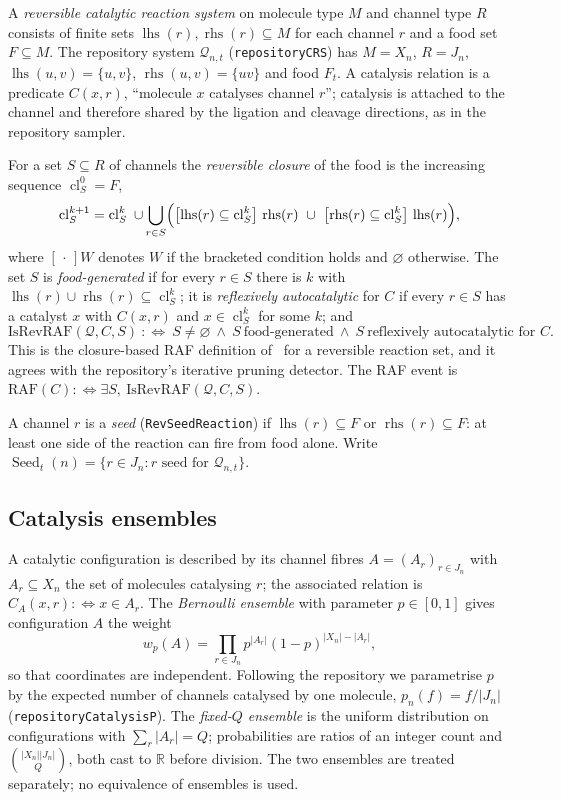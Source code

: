 \documentclass[11pt,a4paper]{article}
\theoremstyle{plain}
\theoremstyle{definition}
\theoremstyle{remark}
\newcommand{\lean}[1]{\begingroup\def\_{\char`\_\allowbreak}\texttt{#1}\endgroup}
\newcommand{\RAF}{\mathrm{RAF}}
\newcommand{\cQ}{\mathcal{Q}}
\newcommand{\lhs}{\operatorname{lhs}}
\newcommand{\rhs}{\operatorname{rhs}}
\newcommand{\cl}{\operatorname{cl}}
\newcommand{\seed}{\operatorname{Seed}}
\newcommand{\Real}{\mathbb{R}}
\begin{document}
A \emph{reversible catalytic reaction system} on molecule type $M$ and channel type $R$ consists of finite sets $\lhs(r),\rhs(r)\subseteq M$ for each channel $r$ and a food set $F\subseteq M$. The repository system $\cQ_{n,t}$ (\lean{repositoryCRS}) has $M=X_n$, $R=J_n$, $\lhs(u,v)=\{u,v\}$, $\rhs(u,v)=\{uv\}$ and food $F_t$. A catalysis relation is a predicate $C(x,r)$, ``molecule $x$ catalyses channel $r$''; catalysis is attached to the channel and therefore shared by the ligation and cleavage directions, as in the repository sampler.

For a set $S\subseteq R$ of channels the \emph{reversible closure} of the food is the increasing sequence $\cl^0_S=F$,
\[
\cl^{k+1}_S=\cl^k_S\ \cup\bigcup_{r\in S}\Bigl(\bigl[\lhs(r)\subseteq\cl^k_S\bigr]\,\rhs(r)\ \cup\ \bigl[\rhs(r)\subseteq\cl^k_S\bigr]\,\lhs(r)\Bigr),
\]
where $[\,\cdot\,]W$ denotes $W$ if the bracketed condition holds and $\varnothing$ otherwise. The set $S$ is \emph{food-generated} if for every $r\in S$ there is $k$ with $\lhs(r)\cup\rhs(r)\subseteq\cl^k_S$; it is \emph{reflexively autocatalytic} for $C$ if every $r\in S$ has a catalyst $x$ with $C(x,r)$ and $x\in\cl^k_S$ for some $k$; and
\[
\mathrm{IsRevRAF}(\cQ,C,S)\ :\Longleftrightarrow\ S\neq\varnothing\ \wedge\ S\ \text{food-generated}\ \wedge\ S\ \text{reflexively autocatalytic for }C.
\]
This is the closure-based RAF definition of~\cite{hordijk2004detecting,hordijk2011required} for a reversible reaction set, and it agrees with the repository's iterative pruning detector. The RAF event is $\RAF(C):\Leftrightarrow\exists S,\ \mathrm{IsRevRAF}(\cQ,C,S)$.

A channel $r$ is a \emph{seed} (\lean{RevSeedReaction}) if $\lhs(r)\subseteq F$ or $\rhs(r)\subseteq F$: at least one side of the reaction can fire from food alone. Write $\seed_t(n)=\{r\in J_n: r\text{ seed for }\cQ_{n,t}\}$.

\subsection{Catalysis ensembles}

A catalytic configuration is described by its channel fibres $A=(A_r)_{r\in J_n}$ with $A_r\subseteq X_n$ the set of molecules catalysing $r$; the associated relation is $C_A(x,r):\Leftrightarrow x\in A_r$. The \emph{Bernoulli ensemble} with parameter $p\in[0,1]$ gives configuration $A$ the weight
\[
w_p(A)=\prod_{r\in J_n}p^{|A_r|}(1-p)^{|X_n|-|A_r|},
\]
so that coordinates are independent. Following the repository we parametrise $p$ by the expected number of channels catalysed by one molecule, $p_n(f)=f/|J_n|$ (\lean{repositoryCatalysisP}). The \emph{fixed-$Q$ ensemble} is the uniform distribution on configurations with $\sum_r|A_r|=Q$; probabilities are ratios of an integer count and $\binom{|X_n||J_n|}{Q}$, both cast to $\Real$ before division. The two ensembles are treated separately; no equivalence of ensembles is used.
\end{document}
